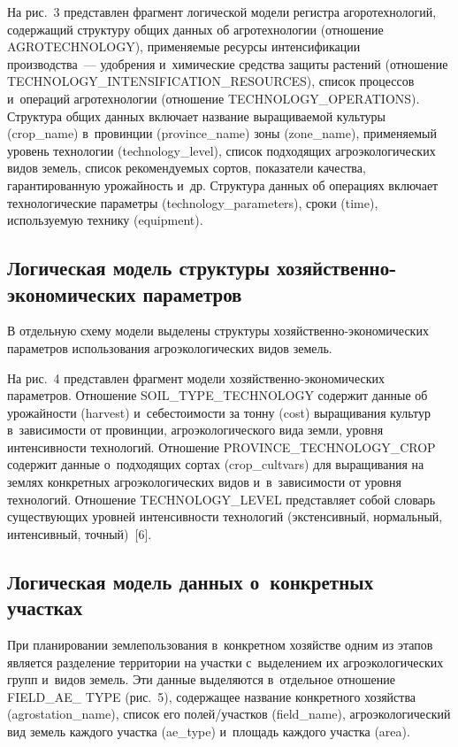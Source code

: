 \begin{multicols}{2}
    На рис.~3 представлен фрагмент логической модели регистра 
агоротехнологий, содержащий структуру общих данных об агротехнологии 
(отношение AGROTECHNOLOGY), применяемые ресурсы интенсификации 
производства~--- удобрения и~химические средства защиты растений 
(отношение TECHNOLOGY\_INTENSIFICATION\_\linebreak RESOURCES), список 
процессов и~операций агротехнологии (отношение 
TECHNOLOGY\_\linebreak OPERATIONS). Структура общих данных включает название 
выращиваемой культуры (crop\_name) в~провинции (province\_name) зоны 
(zone\_name), применяемый уровень технологии (technology\_\linebreak level), список 
подходящих агроэкологических видов земель, список рекомендуемых сортов, 
показатели качества, гарантированную урожайность и~др. Структура 
данных об операциях включает технологические параметры 
(technology\_parameters), сроки (time), используемую технику (equipment).

\subsection{Логическая модель структуры хозяйственно-экономических 
параметров}

    В отдельную схему модели выделены структуры  
хо\-зяй\-ст\-вен\-но-эко\-но\-ми\-че\-ских параметров использования 
агроэкологических видов земель.
    


    На рис.~4 представлен фрагмент модели  
хо\-зяй\-ст\-вен\-но-эко\-но\-ми\-че\-ских параметров. Отношение 
SOIL\_TYPE\_TECHNOLOGY содержит данные об урожайности (harvest) 
и~себестоимости за тонну (cost) выращивания культур в~за\-ви\-си\-мости от 
провинции, агроэкологического вида земли, уровня ин\-тен\-сив\-ности 
технологий. Отношение PROVINCE\_TECHNOLOGY\_CROP содержит 
данные о~подходящих сортах (crop\_cultvars) для выращивания на землях 
конкретных агроэкологических видов и~в~за\-ви\-си\-мости от уровня технологий. 
Отношение TECHNOLOGY\_LEVEL представляет собой словарь 
су\-щест\-ву\-ющих уровней ин\-тен\-сив\-ности технологий (экстенсивный, 
нормальный, интенсивный, точный)~[6]. 
    
\subsection{Логическая модель данных о~конкретных участках}

    При планировании землепользования в~конкретном хозяйстве одним из 
этапов является разделение территории на участки с~выделением их 
агроэкологических групп и~видов земель. Эти данные выделяются 
в~отдельное отношение FIELD\_AE\_ TYPE (рис.~5), содержащее название 
конкретного хозяйства (agrostation\_name), список его по\-лей/участ\-ков 
(field\_name), агроэкологический вид земель каждого участка (ae\_type) 
и~площадь каждого участка (area). 



\end{multicols}
